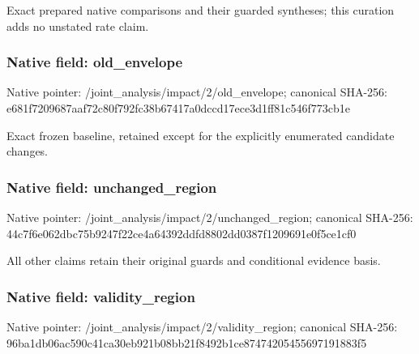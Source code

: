 \documentclass[10pt,a4paper]{article}
\begin{document}
\begingroup\raggedright\sloppy Exact prepared native comparisons and their guarded syntheses;\allowbreak{} this curation adds no unstated rate claim.\par\endgroup

\subsubsection{Native field: old\_\allowbreak{}envelope}
Native pointer: /joint\_\allowbreak{}analysis/impact/2/old\_\allowbreak{}envelope; canonical SHA-256: e681f7209687aaf72c80f792fc38b67417a0dccd17ece3d1ff81c546f773cb1e

\begingroup\raggedright\sloppy Exact frozen baseline,\allowbreak{} retained except for the explicitly enumerated candidate changes.\par\endgroup

\subsubsection{Native field: unchanged\_\allowbreak{}region}
Native pointer: /joint\_\allowbreak{}analysis/impact/2/unchanged\_\allowbreak{}region; canonical SHA-256: 44c7f6e062dbc75b9247f22ce4a64392ddfd8802dd0387f1209691e0f5ce1cf0

\begingroup\raggedright\sloppy All other claims retain their original guards and conditional evidence basis.\par\endgroup

\subsubsection{Native field: validity\_\allowbreak{}region}
Native pointer: /joint\_\allowbreak{}analysis/impact/2/validity\_\allowbreak{}region; canonical SHA-256: 96ba1db06ac590c41ca30eb921b08bb21f8492b1ce87474205455697191883f5
\end{document}
